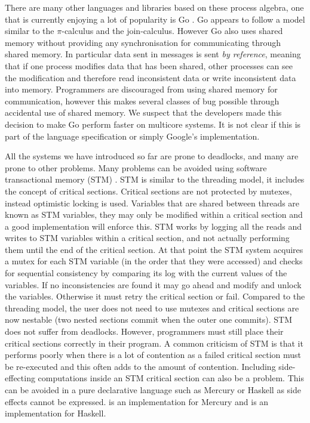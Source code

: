 There are many other languages and libraries based on these process algebra,
one that is currently enjoying a lot of popularity is Go
\citep{balbaert:2012:go}.
Go appears to follow a model similar to the $\pi$-calculus and the
join-calculus.
However Go also uses shared memory without providing any synchronisation
for communicating through shared memory.
In particular data sent in messages is sent \emph{by reference},
meaning that if one process modifies data that has been shared,
other processes can see the modification and therefore read inconsistent data
or write inconsistent data into memory.
Programmers are discouraged from using shared memory for communication,
however this makes several classes of bug possible through accidental use of
shared memory.
We suspect that the developers made this decision to make Go perform faster on
multicore systems.
It is not clear if this is part of the language specification or simply
Google's implementation.

All the systems we have introduced so far are prone to deadlocks,
and many are prone to other problems.
Many problems can be avoided using software transactional memory (STM)
\citep{stm}.
STM is similar to the threading model, it includes the concept of critical
sections.
Critical sections are not protected by mutexes,
instead optimistic locking is used.
Variables that are shared between threads are known as STM variables,
they may only be modified within a critical section and a good implementation
will enforce this.
STM works by logging all the reads and writes to STM variables within a
critical section, and not actually performing them until the end of the
critical section.
At that point the STM system acquires a mutex for each STM variable (in the
order that they were accessed)
and checks for sequential consistency by comparing its log with the current
values of the variables.
If no inconsistencies are found
it may go ahead and modify and unlock the variables.
Otherwise it must retry the critical section or fail.
Compared to the threading model,
the user does not need to use mutexes and critical sections are now
nestable (two nested sections commit when the outer one commits).
STM does not suffer from deadlocks.
However, programmers must still place their critical sections correctly in
their program.
A common criticism of STM is that it performs poorly when there is a lot of
contention as a failed critical section must be re-executed and this often
adds to the amount of contention.
Including side-effecting computations inside an STM critical section can also
be a problem.
This can be avoided in a pure declarative language such as
Mercury \citep{jlp:mercury} or Haskell \citep{Haskell} as side effects cannot
be expressed.
\citet{mika:mercury-stm} is an implementation for Mercury
and \citet{harris:2005:haskell-stm} is an implementation for Haskell.


